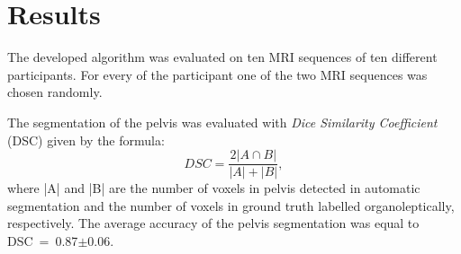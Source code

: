 \section{Results}
The developed algorithm was evaluated on ten MRI sequences of ten different participants. For every of the participant one of the two  MRI sequences was chosen randomly.

The segmentation of the pelvis was evaluated with \textit{Dice Similarity Coefficient} (DSC) given by the formula:
\begin{equation}
	\label{eq:dice}
	DSC = \dfrac{2|A\cap{}B|}{|A|+|B|},
\end{equation}
where |A| and |B| are the number of voxels in pelvis detected  in automatic segmentation and the number of voxels in ground truth labelled organoleptically, respectively.
The average accuracy of the pelvis segmentation was equal to DSC~=~0.87$\pm$0.06.




